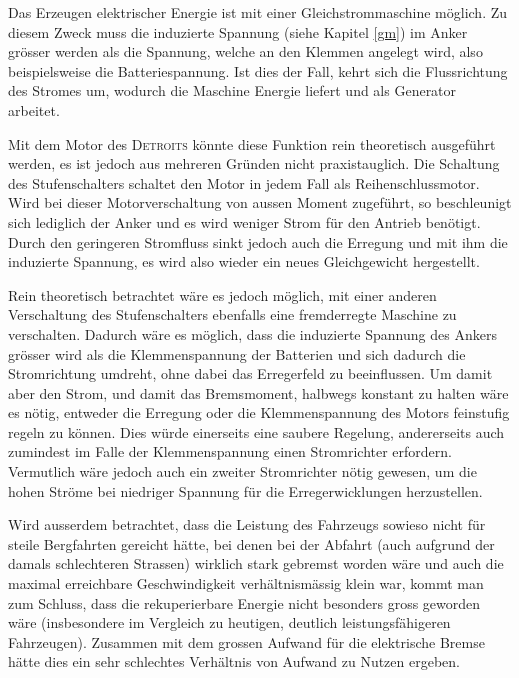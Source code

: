 Das Erzeugen elektrischer Energie ist mit einer Gleichstrommaschine möglich. Zu diesem Zweck muss die induzierte Spannung (siehe Kapitel \ref{gm}) im Anker grösser werden als die Spannung, welche an den Klemmen angelegt wird, also beispielsweise die Batteriespannung. Ist dies der Fall, kehrt sich die Flussrichtung des Stromes um, wodurch die Maschine Energie liefert und als Generator arbeitet.

Mit dem Motor des \textsc{Detroits} könnte diese Funktion rein theoretisch ausgeführt werden, es ist jedoch aus mehreren Gründen nicht praxistauglich. Die Schaltung des Stufenschalters schaltet den Motor in jedem Fall als Reihenschlussmotor. Wird bei dieser Motorverschaltung von aussen Moment zugeführt, so beschleunigt sich lediglich der Anker und es wird weniger Strom für den Antrieb benötigt. Durch den geringeren Stromfluss sinkt jedoch auch die Erregung und mit ihm die induzierte Spannung, es wird also wieder ein neues Gleichgewicht hergestellt.

Rein theoretisch betrachtet wäre es jedoch möglich, mit einer anderen Verschaltung des Stufenschalters ebenfalls eine fremderregte Maschine zu verschalten. Dadurch wäre es möglich, dass die induzierte Spannung des Ankers grösser wird als die Klemmenspannung der Batterien und sich dadurch die Stromrichtung umdreht, ohne dabei das Erregerfeld zu beeinflussen. Um damit aber den Strom, und damit das Bremsmoment, halbwegs konstant zu halten wäre es nötig, entweder die Erregung oder die Klemmenspannung des Motors feinstufig regeln zu können. Dies würde einerseits eine saubere Regelung, andererseits auch zumindest im Falle der Klemmenspannung einen Stromrichter erfordern. Vermutlich wäre jedoch auch ein zweiter Stromrichter nötig gewesen, um die hohen Ströme bei niedriger Spannung für die Erregerwicklungen herzustellen.

Wird ausserdem betrachtet, dass die Leistung des Fahrzeugs sowieso nicht für steile Bergfahrten gereicht hätte, bei denen bei der Abfahrt (auch aufgrund der damals schlechteren Strassen) wirklich stark gebremst worden wäre und auch die maximal erreichbare Geschwindigkeit verhältnismässig klein war, kommt man zum Schluss, dass die rekuperierbare Energie nicht besonders gross geworden wäre (insbesondere im Vergleich zu heutigen, deutlich leistungsfähigeren Fahrzeugen). Zusammen mit dem grossen Aufwand für die elektrische Bremse hätte dies ein sehr schlechtes Verhältnis von Aufwand zu Nutzen ergeben.